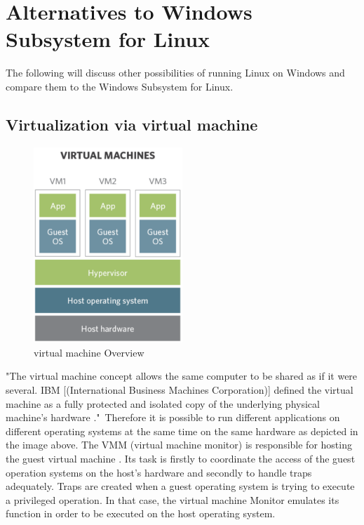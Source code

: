 \documentclass[utf8,biblatex, ngerman, english]{lni}
\begin{document}
\section{Alternatives to Windows Subsystem for Linux}
The following will discuss other possibilities of running Linux on Windows and compare them to the Windows Subsystem for Linux.

\subsection{Virtualization via virtual machine}

\begin{figure}
  \centering
  \includegraphics[width=0.5\textwidth]{VM.pdf}
  \caption{virtual machine Overview}
  \label{img:vm}
\end{figure}


"The virtual machine concept allows the same computer to be shared as if it were several. IBM [(International Business Machines Corporation)] defined the virtual machine as a fully protected and isolated copy of the underlying physical machine’s hardware \cite[p. 2]{Ro01}."\ 
Therefore it is possible to run different applications on different operating systems at the same time on the same hardware as depicted in the image above. The VMM (virtual machine monitor) is responsible for hosting the guest virtual machine \cite[p. 3]{Ro01}. Its task is firstly to coordinate the access of the guest operation systems on the host's hardware and secondly to handle traps adequately. Traps are created when a guest operating system is trying to execute a privileged operation. In that case, the virtual machine Monitor emulates its function in order to be executed on the host operating system.
\end{document}
